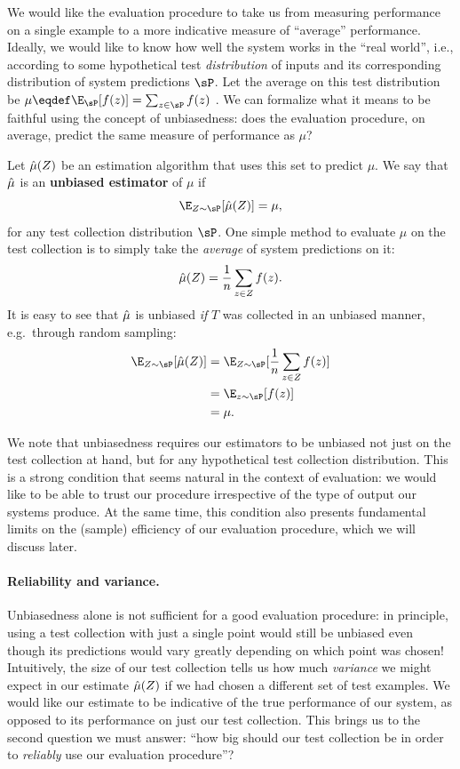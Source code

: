 We would like the evaluation procedure to take us from measuring performance on a single example to a more indicative measure of ``average'' performance.
Ideally, we would like to know how well the system works in the ``real world'', i.e., according to some hypothetical test \textit{distribution} of inputs and its corresponding distribution of system predictions $\sP$.
Let the average on this test distribution be $\mu \eqdef \E_{\sP}[f(z)] = \sum_{z \in \sP} f(z)$ .
We can formalize what it means to be faithful using the concept of unbiasedness: does the evaluation procedure, on average, predict the same measure of performance as $\mu$?

Let $\hat{\mu}(Z)$ be an estimation algorithm that uses this set to predict $\mu$.
We say that $\hat{\mu}$ is an \textbf{unbiased estimator} of $\mu$ if
\[
\E_{Z\sim \sP}[\muh(Z)] = \mu,
\]
for any test collection distribution $\sP$. 
One simple method to evaluate $\mu$ on the test collection is to simply take the \textit{average} of system predictions on it:
\[
\hat{\mu}(Z) = \frac{1}{n} \sum_{z \in Z} f(z).
\]
It is easy to see that $\hat{\mu}$ is unbiased \textit{if} $T$ was collected in an unbiased manner, e.g.\ through random sampling:
\begin{align*}
  \E_{Z \sim \sP}[\muh(Z)] 
    &= \E_{Z \sim \sP}[\frac{1}{n} \sum_{z \in Z} f(z)] \\
    &= \E_{z \sim \sP}[f(z)] \\
    &= \mu.
\end{align*}

We note that unbiasedness requires our estimators to be unbiased not just on the test collection at hand, but for any hypothetical test collection distribution.
This is a strong condition that seems natural in the context of evaluation: we would like to be able to trust our procedure irrespective of the type of output our systems produce.
At the same time, this condition also presents fundamental limits on the (sample) efficiency of our evaluation procedure, which we will discuss later.

\paragraph{Reliability and variance.}
Unbiasedness alone is not sufficient for a good evaluation procedure: in principle, using a test collection with just a single point would still be unbiased even though its predictions would vary greatly depending on which point was chosen!
Intuitively, the size of our test collection tells us how much \textit{variance} we might expect in our estimate $\hat{\mu}(Z)$ if we had chosen a different set of test examples.  
We would like our estimate to be indicative of the true performance of our system, as opposed to its performance on just our test collection.
This brings us to the second question we must answer: ``how big should our test collection be in order to \textit{reliably} use our evaluation procedure''?

